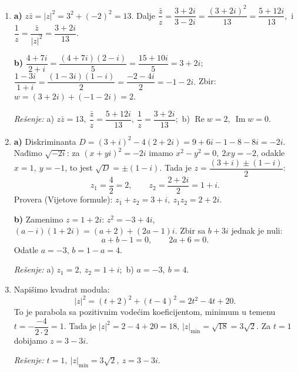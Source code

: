 \begin{enumerate}[label=\arabic*.]
\textit{Rešenje:} a) $\dfrac{1}{2}-\dfrac{\sqrt{3}}{2}\,i$;\ b) $-2^{1013}\,i$;\ v) $\sqrt{3}+i,\ -1+\sqrt{3}\,i,\ -\sqrt{3}-i,\ 1-\sqrt{3}\,i.$

\item \textbf{a)} $z\bar z=|z|^2=3^2+(-2)^2=13.$ Dalje $\dfrac{\bar z}{z}=\dfrac{3+2i}{3-2i}=\dfrac{(3+2i)^2}{13}=\dfrac{5+12i}{13},$ i $\dfrac{1}{z}=\dfrac{\bar z}{|z|^2}=\dfrac{3+2i}{13}.$

\textbf{b)} $\dfrac{4+7i}{2+i}=\dfrac{(4+7i)(2-i)}{5}=\dfrac{15+10i}{5}=3+2i;$ $\dfrac{1-3i}{1+i}=\dfrac{(1-3i)(1-i)}{2}=\dfrac{-2-4i}{2}=-1-2i.$ Zbir: $w=(3+2i)+(-1-2i)=2.$

\textit{Rešenje:} a) $z\bar z=13,\ \dfrac{\bar z}{z}=\dfrac{5+12i}{13},\ \dfrac{1}{z}=\dfrac{3+2i}{13}$;\ b) $\operatorname{Re}w=2,\ \operatorname{Im}w=0.$

\item \textbf{a)} Diskriminanta $D=(3+i)^2-4(2+2i)=9+6i-1-8-8i=-2i.$ Nađimo $\sqrt{-2i}$: za $(x+yi)^2=-2i$ imamo $x^2-y^2=0,\ 2xy=-2$, odakle $x=1,\ y=-1$, to jest $\sqrt{D}=\pm(1-i).$ Tada je $z=\dfrac{(3+i)\pm(1-i)}{2}$:
\[ z_1=\dfrac{4}{2}=2,\qquad z_2=\dfrac{2+2i}{2}=1+i. \]
Provera (Vijetove formule): $z_1+z_2=3+i,\ z_1z_2=2+2i.$

\textbf{b)} Zamenimo $z=1+2i$: $z^2=-3+4i$, $(a-i)(1+2i)=(a+2)+(2a-1)i$. Zbir sa $b+3i$ jednak je nuli:
\[ a+b-1=0,\qquad 2a+6=0. \]
Odatle $a=-3$, $b=1-a=4.$

\textit{Rešenje:} a) $z_1=2,\ z_2=1+i$;\ b) $a=-3,\ b=4.$

\item Napišimo kvadrat modula:
\[ |z|^2=(t+2)^2+(t-4)^2=2t^2-4t+20. \]
To je parabola sa pozitivnim vodećim koeficijentom, minimum u temenu $t=-\dfrac{-4}{2\cdot2}=1.$ Tada je $|z|^2=2-4+20=18$, $|z|_{\min}=\sqrt{18}=3\sqrt{2}.$ Za $t=1$ dobijamo $z=3-3i.$

\textit{Rešenje:} $t=1,\ |z|_{\min}=3\sqrt{2},\ z=3-3i.$
\end{enumerate}
\clearpage
